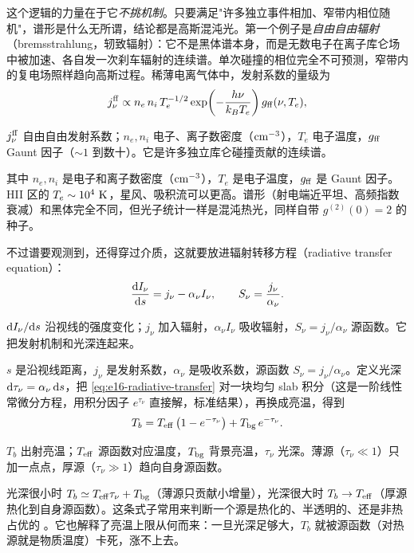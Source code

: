 这个逻辑的力量在于它\emph{不挑机制}。只要满足"许多独立事件相加、窄带内相位随机"，谱形是什么无所谓，结论都是高斯混沌光。第一个例子是\emph{自由自由辐射}（bremsstrahlung，轫致辐射）：它不是黑体谱本身，而是无数电子在离子库仑场中被加速、各自发一次刹车辐射的连续谱。单次碰撞的相位完全不可预测，窄带内的复电场照样趋向高斯过程。稀薄电离气体中，发射系数的量级为
\begin{equation}
  j_\nu^{\rm ff}\propto
  n_e\,n_i\,T_e^{-1/2}
  \exp\!\left(-\frac{h\nu}{k_BT_e}\right)
  g_{\rm ff}(\nu,T_e),
  \label{eq:e16-free-free}
\end{equation}
\begin{formulaexplain}
\(j_\nu^{\rm ff}\) 自由自由发射系数；\(n_e,n_i\) 电子、离子数密度（\({\rm cm^{-3}}\)），\(T_e\) 电子温度，\(g_{\rm ff}\) Gaunt 因子（\(\sim1\) 到数十）。它是许多独立库仑碰撞贡献的连续谱。
\end{formulaexplain}
其中 \(n_e,n_i\) 是电子和离子数密度（\({\rm cm^{-3}}\)），\(T_e\) 是电子温度，\(g_{\rm ff}\) 是 Gaunt 因子。HII 区的 \(T_e\sim10^4~{\rm K}\)，星风、吸积流可以更高。谱形（射电端近平坦、高频指数衰减）和黑体完全不同，但光子统计一样是混沌热光，同样自带 \(g^{(2)}(0)=2\) 的种子。

不过谱要观测到，还得穿过介质，这就要放进辐射转移方程（radiative transfer equation）：
\begin{equation}
  \frac{{\rm d}I_\nu}{{\rm d}s}=j_\nu-\alpha_\nu I_\nu,
  \qquad
  S_\nu=\frac{j_\nu}{\alpha_\nu}.
  \label{eq:e16-radiative-transfer}
\end{equation}
\begin{formulaexplain}
\({\rm d}I_\nu/{\rm d}s\) 沿视线的强度变化；\(j_\nu\) 加入辐射，\(\alpha_\nu I_\nu\) 吸收辐射，\(S_\nu=j_\nu/\alpha_\nu\) 源函数。它把发射机制和光深连起来。
\end{formulaexplain}
\(s\) 是沿视线距离，\(j_\nu\) 是发射系数，\(\alpha_\nu\) 是吸收系数，源函数 \(S_\nu=j_\nu/\alpha_\nu\)。定义光深 \({\rm d}\tau_\nu=\alpha_\nu\,{\rm d}s\)，把 \eqref{eq:e16-radiative-transfer} 对一块均匀 slab 积分（这是一阶线性常微分方程，用积分因子 \(e^{\tau_\nu}\) 直接解，标准结果），再换成亮温，得到
\begin{equation}
  T_b=T_{\rm eff}\left(1-e^{-\tau_\nu}\right)+T_{\rm bg}\,e^{-\tau_\nu}.
  \label{eq:e16-tb-transfer}
\end{equation}
\begin{formulaexplain}
\(T_b\) 出射亮温；\(T_{\rm eff}\) 源函数对应温度，\(T_{\rm bg}\) 背景亮温，\(\tau_\nu\) 光深。薄源（\(\tau_\nu\ll1\)）只加一点点，厚源（\(\tau_\nu\gg1\)）趋向自身源函数。
\end{formulaexplain}
光深很小时 \(T_b\simeq T_{\rm eff}\tau_\nu+T_{\rm bg}\)（薄源只贡献小增量），光深很大时 \(T_b\to T_{\rm eff}\)（厚源热化到自身源函数）。这条式子常用来判断一个源是热化的、半透明的、还是非热占优的 \citep{1979rpa..book.....R,2011piim.book.....D,1985ARA&A..23..169D}。它也解释了亮温上限从何而来：一旦光深足够大，\(T_b\) 就被源函数（对热源就是物质温度）卡死，涨不上去。

